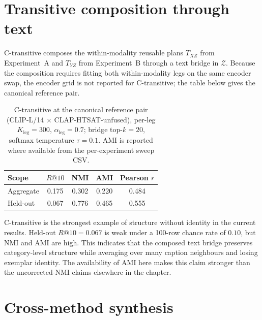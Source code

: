 \section{Transitive composition through text}
\label{sec:res-ctrans}

C-transitive composes the within-modality reusable plans $T_{X\!Z}$
from Experiment~A and $T_{Y\!Z}$ from Experiment~B through a text
bridge in $\mathcal{Z}$. Because the composition requires fitting both
within-modality legs on the same encoder swap, the encoder grid is not
reported for C-transitive; the table below gives the canonical
reference pair.


\begin{table}[!ht]
\centering
\small
\setlength{\tabcolsep}{5pt}
\begin{tabular}{l c c c c}
\toprule
Scope & $R@10$ & NMI & AMI & Pearson $r$ \\
\midrule
Aggregate & 0.175 & 0.302 & 0.220 & 0.484 \\
Held-out  & 0.067 & 0.776 & 0.465 & 0.555 \\
\bottomrule
\end{tabular}
\caption{C-transitive at the canonical reference pair (CLIP-L/14 $\times$ CLAP-HTSAT-unfused), per-leg $K_{\text{leg}}=300$, $\alpha_{\text{leg}}=0.7$; bridge top-$k=20$, softmax temperature $\tau=0.1$. AMI is reported where available from the per-experiment sweep CSV.}
\label{tab:c-trans-canonical}
\end{table}

C-transitive is the strongest example of structure without identity in
the current results. Held-out $R@10=0.067$ is weak under a 100-row
chance rate of $0.10$, but NMI and AMI are high. This indicates that
the composed text bridge preserves category-level structure while
averaging over many caption neighbours and losing exemplar identity.
The availability of AMI here makes this claim stronger than the
uncorrected-NMI claims elsewhere in the chapter.


\section{Cross-method synthesis}
\label{sec:res-synthesis}


